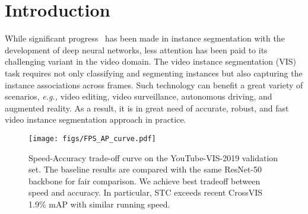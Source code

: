 \documentclass[runningheads]{llncs}
\begin{document}
\section{Introduction}
\label{sec:intro}
While significant progress~\cite{he2017mask,bolya2019yolact,wang2020centermask,liu2018path,xie2020polarmask,wang2020solo,wang2020solov2,tian2020conditional,lin2021video,oksuz2021rank} has been made in instance segmentation with the development of deep neural networks, less attention has been paid to its challenging variant in the video domain. The video instance segmentation (VIS)~\cite{yang2019video,yang2021crossover,wang2021end,hwang2021video} task requires not only classifying and segmenting instances but also capturing the instance associations across frames. Such technology can benefit a great variety of scenarios, {\em e.g.,} video editing, video surveillance, autonomous driving, and augmented reality. As a result, it is in great need of accurate, robust, and fast video instance segmentation approach in practice.

\begin{figure}
\centering
\texttt{[image: figs/FPS\_AP\_curve.pdf]}
\caption{Speed-Accuracy trade-off curve on the YouTube-VIS-2019 validation set. The baseline results are compared with the same ResNet-50 backbone for fair comparison. We achieve best tradeoff between speed and accuracy. In particular, STC exceeds recent CrossVIS~\cite{fang2021instances} 1.9\% mAP with similar running speed.}
\label{FPS_AP}
\end{figure}
\end{document}
